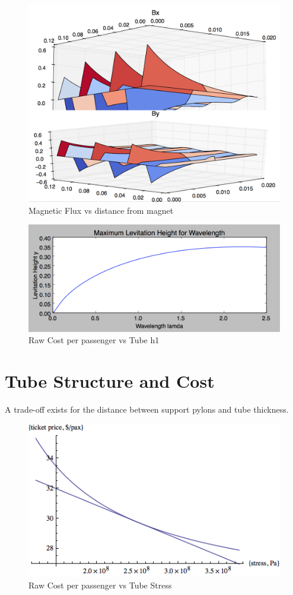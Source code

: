 \documentclass[heading.tex]{subfiles}
\begin{document}
	\begin{figure}[hbtp]
		\centering
		\includegraphics[width=.75\textwidth]{images/halbach1.png}
		\caption[h1]{Magnetic Flux vs distance from magnet}
		\label{f:h1}
	\end{figure}

	\begin{figure}[hbtp]
		\centering
		\includegraphics[width=.75\textwidth]{images/halbach2.png}
		\caption[h2]{Raw Cost per passenger vs Tube h1}
		\label{f:h2}
	\end{figure}


\section{Tube Structure and Cost}

	A trade-off exists for the distance between support pylons and tube thickness.

	\begin{figure}[hbtp]
		\centering
		\includegraphics[width=.75\textwidth]{images/cost_stress.png}
		\caption[stress]{Raw Cost per passenger vs Tube Stress}
		\label{f:stress}
	\end{figure}
\end{document}
